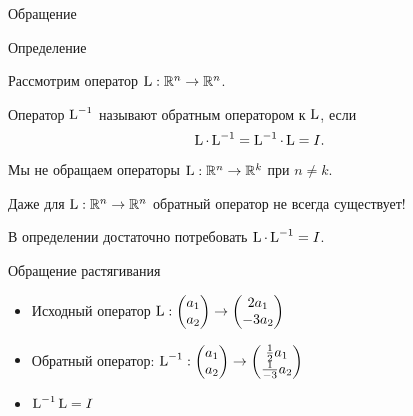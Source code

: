

\begin{frame} %


\end{frame}
  

\begin{frame}{Обращение}




\begin{block}{Определение}

Рассмотрим оператор $\operatorname{L} : \mathbb{R}^n \to \mathbb{R}^n$. 

Оператор $\operatorname{L}^{-1}$ называют \alert{обратным оператором} к $\operatorname{L}$, если 
\[
\operatorname{L} \cdot \operatorname{L}^{-1} = \operatorname{L}^{-1} \cdot  \operatorname{L} = I.
\]
\end{block}

\pause

Мы не обращаем операторы $\operatorname{L}: \mathbb{R}^n \to \mathbb{R}^k$ при $n \neq k$.

\pause

Даже для $\operatorname{L}: \mathbb{R}^n \to \mathbb{R}^n$ обратный оператор не всегда существует!

\pause

В определении достаточно потребовать $\operatorname{L} \cdot \operatorname{L}^{-1} = I$.


\end{frame}


\begin{frame}{Обращение растягивания}

\begin{itemize}[<+->]
    \item 
Исходный оператор $\operatorname{L} : \begin{pmatrix}
  a_1 \\
  a_2 \\
\end{pmatrix} \to
\begin{pmatrix}
  2a_1 \\
  -3a_2 \\
\end{pmatrix}
$

\item \alert{Обратный оператор}:  
$\operatorname{L}^{-1} : \begin{pmatrix}
    a_1 \\
    a_2 \\
  \end{pmatrix} \to
  \begin{pmatrix}
    \frac{1}{2}a_1 \\
    \frac{1}{-3}a_2 \\
  \end{pmatrix}
  $

\item $\operatorname{L}^{-1} \operatorname{L} = I$
\end{itemize}


\end{frame}
    

